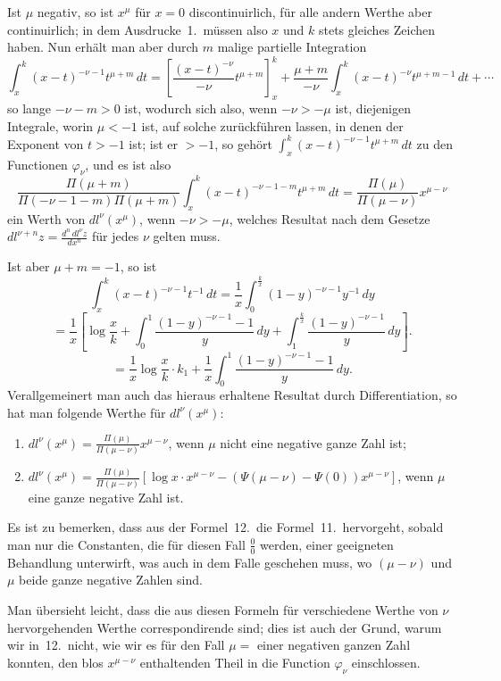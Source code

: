 \documentclass[12pt,a4paper]{article}
\begin{document}
Ist $\mu$ negativ, so ist $x^\mu$ f\"ur $x=0$ discontinuirlich, f\"ur alle andern Werthe aber continuirlich; in dem Ausdrucke~1.\ m\"ussen also $x$ und $k$ stets gleiches Zeichen haben. Nun erh\"alt man aber durch $m$ malige partielle Integration
\[
\int_x^k (x-t)^{-\nu-1}t^{\mu+m}\,dt = \left[\frac{(x-t)^{-\nu}}{-\nu}t^{\mu+m}\right]_x^k + \frac{\mu+m}{-\nu}\int_x^k(x-t)^{-\nu}t^{\mu+m-1}\,dt + \cdots
\]
so lange $-\nu-m > 0$ ist, wodurch sich also, wenn $-\nu > -\mu$ ist, diejenigen Integrale, worin $\mu < -1$ ist, auf solche zur\"uckf\"uhren lassen, in denen der Exponent von $t > -1$ ist; ist er $> -1$, so geh\"ort $\int_x^k(x-t)^{-\nu-1}t^{\mu+m}\,dt$ zu den Functionen $\varphi_\nu$, und es ist also
\[
\frac{\Pi(\mu+m)}{\Pi(-\nu-1-m)\Pi(\mu+m)}\int_x^k(x-t)^{-\nu-1-m}t^{\mu+m}\,dt = \frac{\Pi(\mu)}{\Pi(\mu-\nu)}x^{\mu-\nu}
\]
ein Werth von $dl^\nu(x^\mu)$, wenn $-\nu > -\mu$, welches Resultat nach dem Gesetze $dl^{\nu+n}z = \frac{d^n\,dl^\nu z}{dx^n}$ f\"ur jedes $\nu$ gelten muss.

Ist aber $\mu+m = -1$, so ist
\[
\int_x^k(x-t)^{-\nu-1}t^{-1}\,dt = \frac{1}{x}\int_0^{\frac{k}{x}}(1-y)^{-\nu-1}y^{-1}\,dy
\]
\[
= \frac{1}{x}\left[\log\frac{x}{k} + \int_0^1\frac{(1-y)^{-\nu-1}-1}{y}\,dy + \int_1^{\frac{k}{x}}\frac{(1-y)^{-\nu-1}}{y}\,dy\right].
\]
\[
= \frac{1}{x}\log\frac{x}{k} \cdot k_1 + \frac{1}{x}\int_0^1\frac{(1-y)^{-\nu-1}-1}{y}\,dy.
\]
Verallgemeinert man auch das hieraus erhaltene Resultat durch Differentiation, so hat man folgende Werthe f\"ur $dl^\nu(x^\mu)$:

\begin{enumerate}
\item[$11$.] $\displaystyle dl^\nu(x^\mu) = \frac{\Pi(\mu)}{\Pi(\mu-\nu)}x^{\mu-\nu}$, wenn $\mu$ nicht eine negative ganze Zahl ist;
\item[$12$.] $\displaystyle dl^\nu(x^\mu) = \frac{\Pi(\mu)}{\Pi(\mu-\nu)}\left[\log x \cdot x^{\mu-\nu} - (\Psi(\mu-\nu) - \Psi(0))x^{\mu-\nu}\right]$, wenn $\mu$ eine ganze negative Zahl ist.
\end{enumerate}
Es ist zu bemerken, dass aus der Formel~12.\ die Formel~11.\ hervorgeht, sobald man nur die Constanten, die f\"ur diesen Fall $\frac{0}{0}$ werden, einer geeigneten Behandlung unterwirft, was auch in dem Falle geschehen muss, wo $(\mu-\nu)$ und $\mu$ beide ganze negative Zahlen sind.

Man \"ubersieht leicht, dass die aus diesen Formeln f\"ur verschiedene Werthe von $\nu$ hervorgehenden Werthe correspondirende sind; dies ist auch der Grund, warum wir in~12.\ nicht, wie wir es f\"ur den Fall $\mu = $ einer negativen ganzen Zahl konnten, den blos $x^{\mu-\nu}$ enthaltenden Theil in die Function $\varphi_\nu$ einschlossen.
\end{document}
